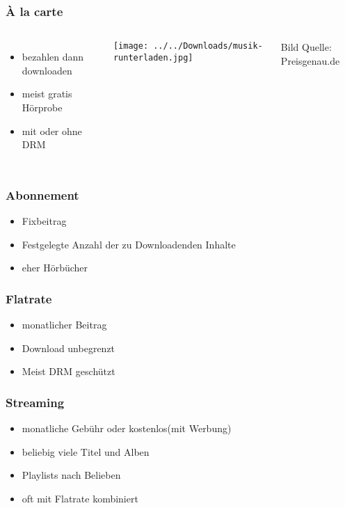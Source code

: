 \documentclass{beamer}
\begin{document}
\begin{frame}
\frametitle{À la carte}
\begin{columns}
	\begin{itemize}
		\Large	
		\item bezahlen dann downloaden
		\vspace{0.5cm}\item meist gratis Hörprobe
		\vspace{0.5cm}\item mit oder ohne DRM
	\end{itemize}
	\texttt{[image: ../../Downloads/musik-runterladen.jpg]}
	\begin{flushright}
		\footnotesize Bild Quelle: Preisgenau.de 
	\end{flushright}	 
\end{columns}	
\end{frame}

\begin{frame}
\frametitle{Abonnement}
\begin{itemize}
	\Large	
	\item Fixbeitrag
	\vspace{0.5cm}\item Festgelegte Anzahl der zu Downloadenden Inhalte
	\vspace{0.5cm}\item eher Hörbücher
\end{itemize}	
\end{frame}

\begin{frame}
\frametitle{Flatrate}
\begin{itemize}
	\Large	
	\item monatlicher Beitrag
	\vspace{0.5cm}\item Download unbegrenzt
	\vspace{0.5cm}\item Meist DRM geschützt
\end{itemize}	
\end{frame}

\begin{frame}
\frametitle{Streaming}
\begin{itemize}
	\Large	
	\item monatliche Gebühr oder kostenlos(mit Werbung)
	\vspace{0.5cm}\item beliebig viele Titel und Alben
	\vspace{0.5cm}\item Playlists nach Belieben
	\item oft mit Flatrate kombiniert
\end{itemize}	
\end{frame}
\end{document}
